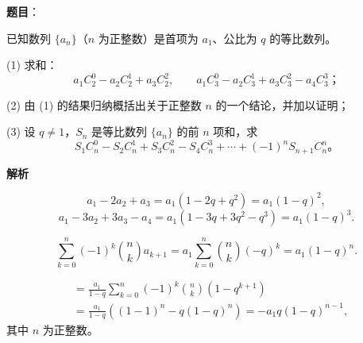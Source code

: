 \begin{answer}

\textbf{题目}：

已知数列 \(\{a_n\}\)（\(n\) 为正整数）是首项为 \(a_1\)、公比为 \(q\) 的等比数列。

    (1) 求和：
\nopagebreak[4]
\[
    a_1C_2^0-a_2C_2^1+a_3C_2^2,\qquad
    a_1C_3^0-a_2C_3^1+a_3C_3^2-a_4C_3^3\text{；}
\]

    (2) 由 (1) 的结果归纳概括出关于正整数 \(n\) 的一个结论，并加以证明；

    (3) 设 \(q\ne1\)，\(S_n\) 是等比数列 \(\{a_n\}\) 的前 \(n\) 项和，求
\nopagebreak[4]
\[
    S_1C_n^0-S_2C_n^1+S_3C_n^2-S_4C_n^3+\cdots+(-1)^nS_{n+1}C_n^n\mbox{。}
\]

\textbf{解析}

\nopagebreak[4]
\[
a_1-2a_2+a_3=a_1(1-2q+q^2)=a_1(1-q)^2,
\]
\nopagebreak[4]
\[
a_1-3a_2+3a_3-a_4=a_1(1-3q+3q^2-q^3)=a_1(1-q)^3.
\]

\nopagebreak[4]
\[
\sum_{k=0}^{n}(-1)^k\binom nk a_{k+1}
=a_1\sum_{k=0}^{n}\binom nk(-q)^k
=a_1(1-q)^n.
\]

\nopagebreak[4]
\[
\begin{aligned}
&=\frac{a_1}{1-q}\sum_{k=0}^n(-1)^k\binom nk(1-q^{k+1})\\
&=\frac{a_1}{1-q}\left((1-1)^n-q(1-q)^n\right)
=-a_1q(1-q)^{n-1},
\end{aligned}
\]
其中 \(n\) 为正整数。




\end{answer}